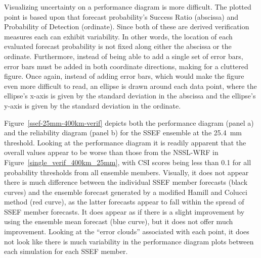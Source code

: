 Visualizing uncertainty on a performance diagram is more difficult.
The plotted point is based upon that forecast probability's Success Ratio (abscissa) and Probability of Detection (ordinate).
Since both of these are derived verification measures each can exhibit variability.
In other words, the location of each evaluated forecast probability is not fixed along either the abscissa or the ordinate.
Furthermore, instead of being able to add a single set of error bars, error bars must be added in both coordinate directions, making for a cluttered figure.
Once again, instead of adding error bars, which would make the figure even more difficult to read, an ellipse is drawn around each data point, where the ellipse's x-axis is given by the standard deviation in the abscissa and the ellipse's y-axis is given by the standard deviation in the ordinate.


\mbox{Figure \ref{ssef-25mm-400km-verif}} depicts both the performance diagram (panel a) and the reliability diagram (panel b) for the SSEF ensemble at the \mbox{25.4 mm} threshold.
Looking at the performance diagram it is readily apparent that the overall values appear to be worse than those from the NSSL-WRF in \mbox{Figure \ref{single_verif_400km_25mm}}, with CSI scores being less than 0.1 for all probability thresholds from all ensemble members.
Visually, it does not appear there is much difference between the individual SSEF member forecasts (black curves) and the ensemble forecast generated by a modified Hamill and Colucci method (red curve), as the latter forecasts appear to fall within the spread of SSEF member forecasts.
It does appear as if there is a slight improvement by using the ensemble mean forecast (blue curve), but it does not offer much improvement.
Looking at the ``error clouds'' associated with each point, it does not look like there is much variability in the performance diagram plots between each simulation for each SSEF member.


